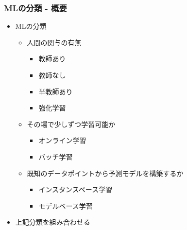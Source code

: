 \documentclass[aspectratio=169, dvipdfmx, 14pt, xcolor={svgnames,dvipsnames}]{beamer}
\def\tightlist{\itemsep1pt\parskip0pt\parsep0pt}
\begin{document}
\begin{frame}
  \frametitle{MLの分類 - 概要}
  \begin{itemize}
    \tightlist
    \item
          MLの分類

          \begin{itemize}
            \tightlist
            \item
                  人間の関与の有無

                  \begin{itemize}
                    \tightlist
                    \item
                          教師あり
                    \item
                          教師なし
                    \item
                          半教師あり
                    \item
                          強化学習
                  \end{itemize}
            \item
                  その場で少しずつ学習可能か

                  \begin{itemize}
                    \tightlist
                    \item
                          オンライン学習
                    \item
                          バッチ学習
                  \end{itemize}
            \item
                  既知のデータポイントから予測モデルを構築するか

                  \begin{itemize}
                    \tightlist
                    \item
                          インスタンスベース学習
                    \item
                          モデルベース学習
                  \end{itemize}
          \end{itemize}
    \item
          上記分類を組み合わせる
  \end{itemize}

\end{frame}

\end{document}
